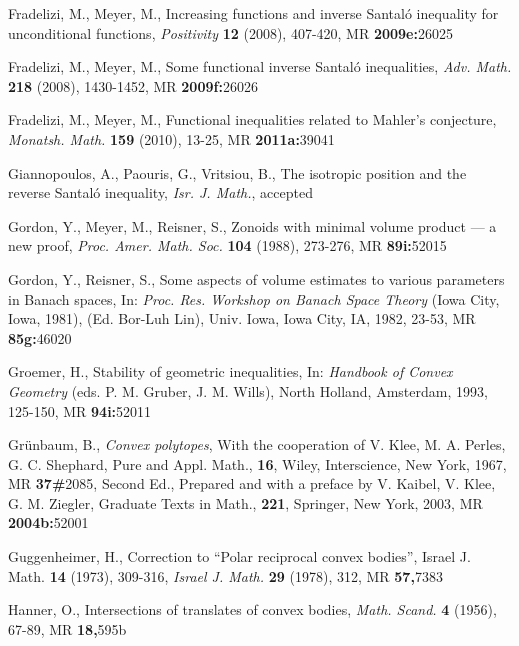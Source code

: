 \documentclass[12pt]{article}
\begin{document}
\begin{thebibliography}{999999}
Fradelizi, M., Meyer, M.,
Increasing functions and inverse Santal\'o inequality for unconditional
functions,
{\it{Positivity}} {\bf{12}} (2008), 407-420, MR {\bf{2009e:}}{\rm{26025}} 

Fradelizi, M., Meyer, M.,
Some functional inverse Santal\'o inequalities, 
{\it{Adv. Math.}} {\bf{218}} (2008), 1430-1452, MR {\bf{2009f:}}{\rm{26026}} 

Fradelizi, M., Meyer, M.,
Functional inequalities related to Mahler's conjecture,
{\it{Monatsh. Math.}} {\bf{159}} (2010), 13-25,
MR {\bf{2011a:}}{\rm{39041}} 

Giannopoulos, A., Paouris, G., Vritsiou, B.,
The isotropic position and the reverse Santal\'o inequality,
{\it{Isr. J. Math.}}, accepted 

Gordon, Y., Meyer, M., Reisner, S.,
Zonoids with minimal volume product --- a new proof,
{\it{Proc. Amer. Math. Soc.}} {\bf{104}} 
(1988), 273-276, MR {\bf{89i:}}{\rm{52015}} 

Gordon, Y., Reisner, S.,
Some aspects of volume estimates to various parameters in Banach spaces,
In: {\it{Proc. Res. Workshop on Banach Space Theory}} (Iowa City, Iowa, 1981), 
(Ed. Bor-Luh Lin), Univ. Iowa, Iowa City, IA, 1982, 23-53, 
MR {\bf{85g:}}{\rm{46020}}

Groemer, H.,
Stability of geometric inequalities,
In: {\it{Handbook of Convex Geometry}} (eds. P. M. Gruber, J. M. Wills),
North Holland, Amsterdam, 1993, 125-150,
MR {\bf{94i:}}{\rm{52011}}

Gr\"unbaum, B.,
{\it{Convex polytopes}}, With the cooperation of V. Klee, M. A. Perles,
G. C. Shephard, Pure and Appl. Math., {\bf{16}}, Wiley, Interscience, New
York, 1967,
MR {\bf{37\#}}{\rm{2085}}, Second Ed., Prepared and with a preface by
V. Kaibel, V. Klee, G. M. Ziegler, Graduate Texts in Math., {\bf{221}},
Springer, New York, 2003, 
MR {\bf{2004b:}}{\rm{52001}}

Guggenheimer, H.,
Correction to ``Polar reciprocal convex bodies'', 
Israel J. Math. {\bf{14}} (1973), 309-316,
{\it{Israel J. Math.}} {\bf{29}} (1978), 312, MR {\bf{57,}}{\rm{7383}}

Hanner, O., Intersections of translates of convex bodies, {\it{Math. Scand.}}
{\bf{4}} (1956), 67-89, 
MR {\bf{18,}}{\rm{595b}}


\end{thebibliography}
\end{document}
